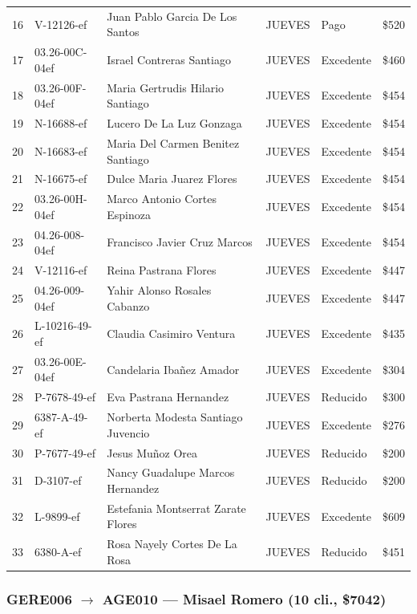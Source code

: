\documentclass[11pt,a4paper]{article}
\newcommand{\money}[1]{\$\num{#1}}
\begin{document}
\begin{center}
\begin{longtable}{rlp{5.5cm}llr}
16 & V-12126-ef & Juan Pablo Garcia De Los Santos & JUEVES & Pago & \money{520} \\
17 & 03.26-00C-04ef & Israel Contreras Santiago & JUEVES & Excedente & \money{460} \\
18 & 03.26-00F-04ef & Maria Gertrudis Hilario Santiago & JUEVES & Excedente & \money{454} \\
19 & N-16688-ef & Lucero De La Luz Gonzaga & JUEVES & Excedente & \money{454} \\
20 & N-16683-ef & Maria Del Carmen Benitez Santiago & JUEVES & Excedente & \money{454} \\
21 & N-16675-ef & Dulce Maria Juarez Flores & JUEVES & Excedente & \money{454} \\
22 & 03.26-00H-04ef & Marco Antonio Cortes Espinoza & JUEVES & Excedente & \money{454} \\
23 & 04.26-008-04ef & Francisco Javier Cruz Marcos & JUEVES & Excedente & \money{454} \\
24 & V-12116-ef & Reina Pastrana Flores & JUEVES & Excedente & \money{447} \\
25 & 04.26-009-04ef & Yahir Alonso Rosales Cabanzo & JUEVES & Excedente & \money{447} \\
26 & L-10216-49-ef & Claudia Casimiro Ventura & JUEVES & Excedente & \money{435} \\
27 & 03.26-00E-04ef & Candelaria Ibañez Amador & JUEVES & Excedente & \money{304} \\
28 & P-7678-49-ef & Eva Pastrana Hernandez & JUEVES & Reducido & \money{300} \\
29 & 6387-A-49-ef & Norberta Modesta Santiago Juvencio & JUEVES & Excedente & \money{276} \\
30 & P-7677-49-ef & Jesus Muñoz Orea & JUEVES & Reducido & \money{200} \\
31 & D-3107-ef & Nancy Guadalupe Marcos Hernandez & JUEVES & Reducido & \money{200} \\
32 & L-9899-ef & Estefania Montserrat Zarate Flores & JUEVES & Excedente & \money{609} \\
33 & 6380-A-ef & Rosa Nayely Cortes De La Rosa & JUEVES & Reducido & \money{451} \\

\bottomrule
\end{longtable}
\end{center}
\subsubsection{GERE006 $\rightarrow$ AGE010 --- Misael Romero (10 cli., \money{7042})}
\end{document}
